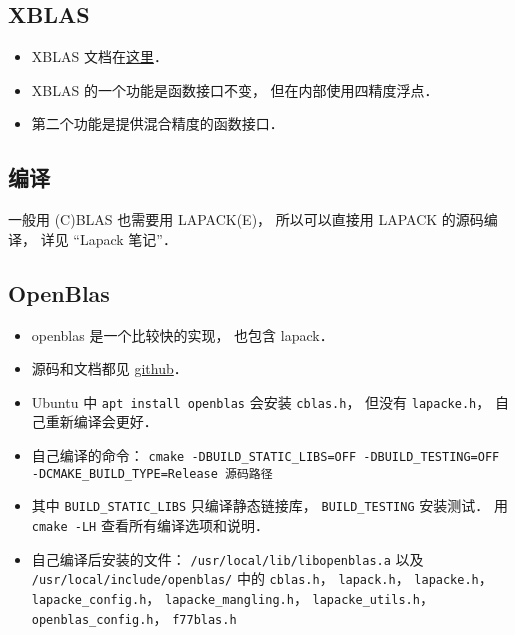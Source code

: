 \subsection{XBLAS}
\begin{itemize}
\item XBLAS 文档在\href{https://netlib.org/xblas/}{这里}．
\item XBLAS 的一个功能是函数接口不变， 但在内部使用四精度浮点．
\item 第二个功能是提供混合精度的函数接口．
\end{itemize}

\subsection{编译}
一般用 (C)BLAS 也需要用 LAPACK(E)， 所以可以直接用 LAPACK 的源码编译， 详见 “Lapack 笔记”．

\subsection{OpenBlas}
\begin{itemize}
\item openblas 是一个比较快的实现， 也包含 lapack．
\item 源码和文档都见 \href{https://github.com/xianyi/OpenBLAS}{github}．
\item Ubuntu 中 \verb|apt install openblas| 会安装 \verb|cblas.h|， 但没有 \verb|lapacke.h|， 自己重新编译会更好．
\item 自己编译的命令： \verb|cmake -DBUILD_STATIC_LIBS=OFF -DBUILD_TESTING=OFF -DCMAKE_BUILD_TYPE=Release 源码路径|
\item 其中 \verb|BUILD_STATIC_LIBS| 只编译静态链接库， \verb|BUILD_TESTING| 安装测试． 用 \verb|cmake -LH| 查看所有编译选项和说明．
\item 自己编译后安装的文件： \verb|/usr/local/lib/libopenblas.a| 以及 \verb|/usr/local/include/openblas/| 中的 \verb|cblas.h|， \verb|lapack.h|， \verb|lapacke.h|， \verb|lapacke_config.h|， \verb|lapacke_mangling.h|， \verb|lapacke_utils.h|， \verb|openblas_config.h|， \verb|f77blas.h|
\end{itemize}
